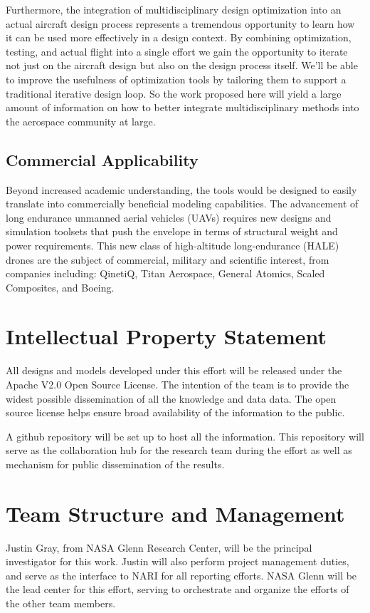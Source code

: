 \documentclass[]{aiaa-tc}
\begin{document}
    Furthermore, the integration of multidisciplinary design optimization into an actual aircraft design process represents
    a tremendous opportunity to learn how it can be used more effectively in a design context. By combining optimization, 
    testing, and actual flight into a single effort we gain the opportunity to iterate not just on the aircraft 
    design but also on the design process itself. We'll be able to improve the usefulness of optimization tools by 
    tailoring them to support a traditional iterative design loop. So the work proposed here will yield a large amount 
    of information on how to better integrate multidisciplinary methods into the aerospace community at large. 

    \subsection{Commercial Applicability}
    Beyond increased academic understanding, the tools would be designed to easily translate into commercially beneficial
    modeling capabilities. The advancement of long endurance unmanned aerial vehicles (UAVs) requires new designs
    and simulation toolsets that push the envelope in terms of structural weight and power requirements. 
    This new class of high-altitude long-endurance (HALE) drones are the subject of commercial,
    military and scientific interest, from companies including:
    QinetiQ, Titan Aerospace, General Atomics, Scaled Composites, and Boeing.

  
\section{Intellectual Property Statement}
    All designs and models developed under this effort will be released under the Apache V2.0 Open Source License. The intention 
    of the team is to provide the widest possible dissemination of all the knowledge and data data. The open source license helps 
    ensure broad availability of the information to the public. 

    A github repository will be set up to host all the information. This repository will serve as the collaboration 
    hub for the research team during the effort as well as mechanism for public dissemination of the results. 

\section{Team Structure and Management}
    Justin Gray, from NASA Glenn Research Center, will be the principal investigator for this work. Justin will also perform 
    project management duties, and serve as the interface to NARI for all reporting efforts. NASA Glenn will be the lead 
    center for this effort, serving to orchestrate and organize the efforts of the other team members. 
\end{document}
